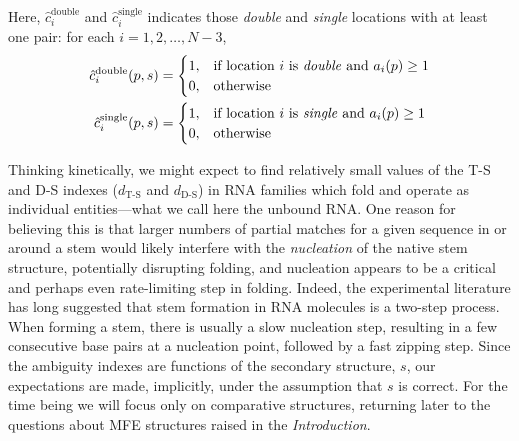 \documentclass[10pt,letterpaper]{article}
\begin{document}
Here, $\hat{c}_i^{\text{double}}$ and $\hat{c}^{\text{single}}_i$ indicates those {\em double} and {\em single} locations with at least one pair: for each $i=1,2,\ldots,N-3$,
\begin{align}
	\hat{c}_i^{\text{double}}(p, s) & =
	\begin{cases}
		1, & \text{if location $i$ is \textit{double} and $a_i(p)\geq 1$} \\
		0, & \text{otherwise}
	\end{cases} \\
	\hat{c}_i^{\text{single}}(p, s) & =
	\begin{cases}
		1, & \text{if location $i$ is \textit{single} and $a_i(p)\geq 1$} \\
		0, & \text{otherwise}
	\end{cases}
\end{align}

Thinking kinetically, we might expect to find relatively small values of the T-S and D-S indexes
($d_\text{T-S}$ and $d_\text{D-S}$)
in RNA families which fold and operate as individual entities---what we call here the unbound RNA. One reason for believing this
is that larger numbers of partial matches for a given sequence in or around a stem would likely interfere with the {\em nucleation} of the native stem structure, potentially disrupting folding, and nucleation appears to be a critical and perhaps even rate-limiting step in folding. 
Indeed, the experimental literature  \cite{Porschke1974-hn, Porschke1974-nr, Porschke1977-xz, Mohan2009-gt} has long suggested that stem formation in RNA molecules is a two-step process. When forming a stem, there is usually a slow nucleation step, resulting in a few consecutive base pairs at a nucleation point, followed by a fast zipping step. 
Since the ambiguity indexes are functions of the secondary structure, $s$, 
our expectations are made, implicitly, under the assumption that $s$ is correct. For the time being we will focus only on comparative structures, returning later to the questions about MFE structures raised in the {\em Introduction}. 
\end{document}
